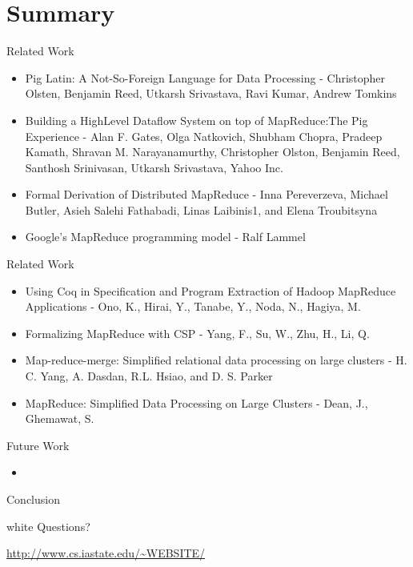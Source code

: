 \section*{Summary}

\begin{frame}{Related Work}
  \begin{itemize}
    \item Pig Latin: A Not-So-Foreign Language for Data Processing - Christopher Olsten, Benjamin Reed, Utkarsh Srivastava, Ravi Kumar, Andrew Tomkins
	\item Building a HighLevel Dataflow System on top of MapReduce:The Pig Experience - Alan F. Gates, Olga Natkovich, Shubham Chopra, Pradeep Kamath, Shravan M. Narayanamurthy, Christopher Olston, Benjamin Reed, Santhosh Srinivasan, Utkarsh Srivastava, Yahoo Inc.
	\item Formal Derivation of Distributed MapReduce - Inna Pereverzeva, Michael Butler, Asieh Salehi Fathabadi, Linas Laibinis1, and Elena Troubitsyna
	\item Google's MapReduce programming model - Ralf Lammel
  \end{itemize}
\end{frame}

\begin{frame}{Related Work}
  \begin{itemize}
    \item Using Coq in Specification and Program Extraction of Hadoop MapReduce Applications - Ono, K., Hirai, Y., Tanabe, Y., Noda, N., Hagiya, M.
    \item Formalizing MapReduce with CSP - Yang, F., Su, W., Zhu, H., Li, Q.
    \item Map-reduce-merge: Simplified relational data processing on large clusters - H. C. Yang, A. Dasdan, R.L. Hsiao, and D. S. Parker
   	\item MapReduce: Simplified Data Processing on Large Clusters - Dean, J., Ghemawat, S.
  \end{itemize}
\end{frame}


\begin{frame}{Future Work}
  \begin{itemize}
    \item %
  \end{itemize}
\end{frame}


\begin{frame}{Conclusion}
\end{frame}


\begin{frame}
\begin{beamercolorbox}[center]{white}
  {\Large Questions?}

  \vspace{2em}\hfill

  \url{http://www.cs.iastate.edu/~WEBSITE/}
\end{beamercolorbox}
\end{frame}
